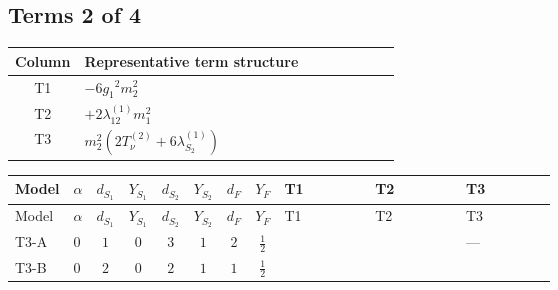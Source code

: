 \documentclass[8pt]{article}
\begin{document}
\begin{landscape}
\subsection*{Terms 2 of 4}
\begin{center}
\begin{tabular}{@{}c >{\raggedright\arraybackslash}p{0.82\linewidth}@{}}
\toprule
Column & Representative term structure \\
\midrule
T1 & \(\displaystyle -6 {g_1}^2 {m_2^2}\) \\
\midrule
T2 & \(\displaystyle +2 {\lambda_{12}^{(1)}} {m_1^2}\) \\
\midrule
T3 & \(\displaystyle {m_2^2} (2 T_{\nu}^{(2)}+6 {\lambda_{S_2}^{(1)}})\) \\
\midrule
\bottomrule
\end{tabular}
\end{center}
\smallskip
\tiny
\begin{longtable}{@{}llcccccc >{\raggedright\arraybackslash}p{0.21\linewidth} >{\raggedright\arraybackslash}p{0.21\linewidth} >{\raggedright\arraybackslash}p{0.21\linewidth}@{}}
\toprule
Model & $\alpha$ & $d_{S_1}$ & $Y_{S_1}$ & $d_{S_2}$ & $Y_{S_2}$ & $d_F$ & $Y_F$ & T1 & T2 & T3 \\
\midrule
\endfirsthead
\toprule
Model & $\alpha$ & $d_{S_1}$ & $Y_{S_1}$ & $d_{S_2}$ & $Y_{S_2}$ & $d_F$ & $Y_F$ & T1 & T2 & T3 \\
\midrule
\endhead
T3-A & $0$ & $1$ & $0$ & $3$ & $1$ & $2$ & $\frac{1}{2}$ & \scriptsize\adjustbox{max width=\linewidth}{$\begin{gathered} -6 {g_1}^2 {m_2^2}\end{gathered}$} & \scriptsize\adjustbox{max width=\linewidth}{$\begin{gathered} +2 {\lambda_{12}^{(1)}} {m_1^2}\end{gathered}$} & --- \\
\midrule
T3-B & $0$ & $2$ & $0$ & $2$ & $1$ & $1$ & $\frac{1}{2}$ & \scriptsize\adjustbox{max width=\linewidth}{$\begin{gathered} -6 {g_1}^2 {m_2^2}\end{gathered}$} & \scriptsize\adjustbox{max width=\linewidth}{$\begin{gathered} +4 {\lambda_{12}^{(1)}} {m_1^2}\end{gathered}$} & \scriptsize\adjustbox{max width=\linewidth}{$\begin{gathered} {m_2^2} (2 T_{\nu}^{(2)}+6 {\lambda_{S_2}^{(1)}})\end{gathered}$} \\

\end{longtable}
\end{landscape}
\end{document}
